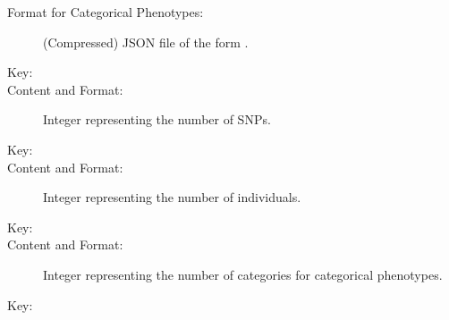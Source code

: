 \documentclass[a4paper,10pt,english]{sphinxhowto}
\begin{document}
\begin{description}
\begin{description}
\begin{description}
\item[{Format for Categorical Phenotypes:}] \leavevmode
(Compressed) JSON file of the form .

\end{description}

\item[{\sphinxcode{\sphinxupquote{\textless{}NUM\_SNPS\textgreater{}}}}] \leavevmode\begin{description}
\item[{Key:}] \leavevmode
{}

\item[{Content and Format:}] \leavevmode
Integer representing the number of SNPs.

\end{description}

\item[{\sphinxcode{\sphinxupquote{\textless{}NUM\_INDS\textgreater{}}}}] \leavevmode\begin{description}
\item[{Key:}] \leavevmode
{}

\item[{Content and Format:}] \leavevmode
Integer representing the number of individuals.

\end{description}

\item[{\sphinxcode{\sphinxupquote{\textless{}NUM\_CATEGORIES\textgreater{}}}}] \leavevmode\begin{description}
\item[{Key:}] \leavevmode
{}

\item[{Content and Format:}] \leavevmode
Integer representing the number of categories for categorical phenotypes.

\end{description}

\item[{\sphinxcode{\sphinxupquote{\textless{}GENOTYPE\_DATA\textgreater{}}}}] \leavevmode\begin{description}
\item[{Key:}] \leavevmode
{}


\end{description}
\end{description}
\end{description}
\end{document}
